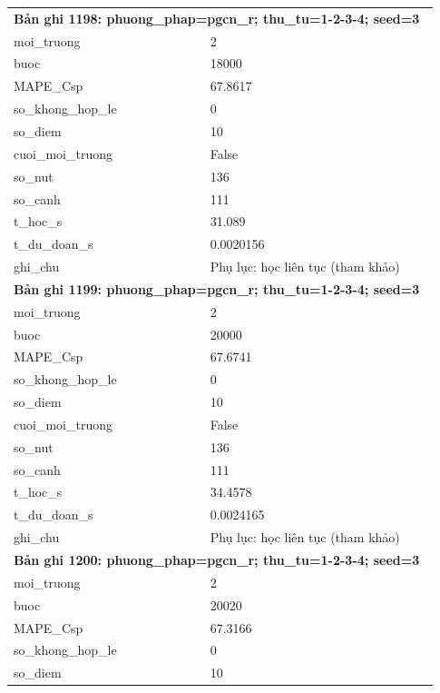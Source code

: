 \begin{longtable}{p{0.43\linewidth}p{0.50\linewidth}}
\midrule
\multicolumn{2}{p{0.95\linewidth}}{\textbf{Bản ghi 1198: phuong\_phap=pgcn\_r; thu\_tu=1-2-3-4; seed=3}} \\
moi\_\allowbreak truong & 2 \\
buoc & 18000 \\
MAPE\_\allowbreak Csp & 67.8617 \\
so\_\allowbreak khong\_\allowbreak hop\_\allowbreak le & 0 \\
so\_\allowbreak diem & 10 \\
cuoi\_\allowbreak moi\_\allowbreak truong & False \\
so\_\allowbreak nut & 136 \\
so\_\allowbreak canh & 111 \\
t\_\allowbreak hoc\_\allowbreak s & 31.089 \\
t\_\allowbreak du\_\allowbreak doan\_\allowbreak s & 0.0020156 \\
ghi\_\allowbreak chu & Phụ lục: học liên tục (tham khảo) \\
\midrule
\multicolumn{2}{p{0.95\linewidth}}{\textbf{Bản ghi 1199: phuong\_phap=pgcn\_r; thu\_tu=1-2-3-4; seed=3}} \\
moi\_\allowbreak truong & 2 \\
buoc & 20000 \\
MAPE\_\allowbreak Csp & 67.6741 \\
so\_\allowbreak khong\_\allowbreak hop\_\allowbreak le & 0 \\
so\_\allowbreak diem & 10 \\
cuoi\_\allowbreak moi\_\allowbreak truong & False \\
so\_\allowbreak nut & 136 \\
so\_\allowbreak canh & 111 \\
t\_\allowbreak hoc\_\allowbreak s & 34.4578 \\
t\_\allowbreak du\_\allowbreak doan\_\allowbreak s & 0.0024165 \\
ghi\_\allowbreak chu & Phụ lục: học liên tục (tham khảo) \\
\midrule
\multicolumn{2}{p{0.95\linewidth}}{\textbf{Bản ghi 1200: phuong\_phap=pgcn\_r; thu\_tu=1-2-3-4; seed=3}} \\
moi\_\allowbreak truong & 2 \\
buoc & 20020 \\
MAPE\_\allowbreak Csp & 67.3166 \\
so\_\allowbreak khong\_\allowbreak hop\_\allowbreak le & 0 \\
so\_\allowbreak diem & 10 \\

\end{longtable}
